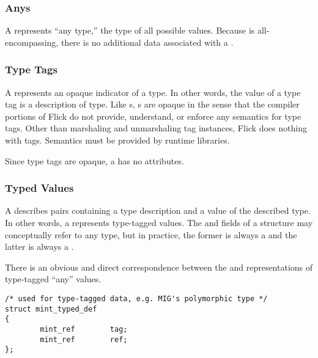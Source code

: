 
\subsubsection{Anys}

A  represents ``any type,'' the type of all possible values.
Because  is all-encompassing, there is no additional data
associated with a \@.


\subsubsection{Type Tags}

A  represents an opaque indicator of a type.  In other
words, the value of a type tag is a description of type.  Like
s, s are opaque in the sense that the
compiler portions of Flick do not provide, understand, or enforce any semantics
for type tags.  Other than marshaling and unmarshaling tag instances, Flick
does nothing with tags.  Semantics must be provided by runtime libraries.

Since type tags are opaque, a  has no attributes.


\subsubsection{Typed Values}

A  describes pairs containing a type description and a value of
the described type.  In other words, a  represents type-tagged
values.  The  and  fields of a  structure
may conceptually refer to any \MINT{} type, but in practice, the former is
always a  and the latter is always a \@.

There is an obvious and direct correspondence between the \MINT{} and \AOI{}
representations of type-tagged ``any'' values.

\begin{verbatim}
/* used for type-tagged data, e.g. MIG's polymorphic type */
struct mint_typed_def
{
        mint_ref        tag;
        mint_ref        ref;
};
\end{verbatim}

